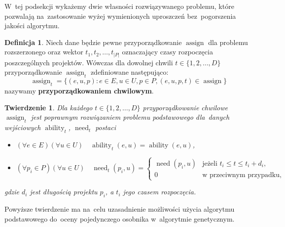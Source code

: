 \documentclass[12pt,a4paper]{article}
\newtheorem{thm}{Twierdzenie}
\theoremstyle{definition}
\newtheorem{defn}{Definicja}
\DeclareMathOperator{\ability}{ability}
\DeclareMathOperator{\need}{need}
\DeclareMathOperator{\assign}{assign}
\begin{document}
\noindent
W~tej podsekcji wykażemy dwie własności rozwiązywanego problemu, które pozwalają na~zastosowanie wyżej wymienionych uproszczeń bez~pogorszenia jakości algorytmu.

\begin{defn}
Niech dane będzie pewne przyporządkowanie $\assign$ dla problemu rozszerzonego oraz wektor $t_1, t_2, \dots, t_{|P|}$ oznaczający czasy rozpoczęcia poszczególnych projektów.
Wówczas dla dowolnej chwili $t \in \{ 1, 2, \dots, D \}$ przyporządkowanie $\assign_t$ zdefiniowane następująco:
$$ \assign_t = \{ (e, u, p) : e \in E, u \in U, p \in P, (e, u, p, t) \in \assign \} $$
nazywamy \textbf{przyporządkowaniem chwilowym}.
\end{defn}

\begin{thm}
\label{thm:assignmoment}
Dla każdego $t \in \{ 1, 2, \dots, D \}$ przyporządkowanie chwilowe $\assign_t$ jest poprawnym rozwiązaniem problemu podstawowego dla~danych wejściowych $\ability_t$, $\need_t$ postaci
\begin{itemize}
	\item $(\forall e \in E) (\forall u \in U) \quad \ability_t(e, u) = \ability(e, u)$,
	\item $(\forall p_i \in P) (\forall u \in U) \quad \need_t(p_i, u) = \begin{cases}
		\need(p_i, u) & \text{jeżeli } t_i \leq t \leq t_i + d_i, \\
		0 & \text{w przeciwnym przypadku},
	\end{cases}$
\end{itemize} 
gdzie $d_i$ jest długością projektu $p_i$, a $t_i$ jego czasem rozpoczęcia.
\end{thm}

\noindent
Powyższe twierdzenie ma na~celu uzasadnienie możliwości użycia algorytmu podstawowego do~oceny pojedynczego osobnika w~algorytmie genetycznym.
\end{document}
